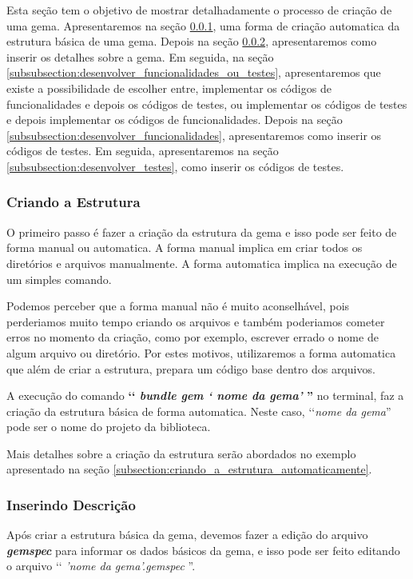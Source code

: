 Esta seção tem o objetivo de mostrar detalhadamente o processo de criação de uma gema.
Apresentaremos na seção \ref{subsubsection:criando_a_estrutura}, uma forma de criação automatica da
estrutura básica de uma gema. Depois na seção \ref{subsubsection:inserindo_descrição},
apresentaremos como inserir os detalhes sobre a gema. Em seguida, na seção
\ref{subsubsection:desenvolver_funcionalidades_ou_testes}, apresentaremos que existe a possibilidade
de escolher entre, implementar os códigos de funcionalidades e depois os códigos de testes, ou
implementar os códigos de testes e depois implementar os códigos de funcionalidades. Depois na seção
\ref{subsubsection:desenvolver_funcionalidades}, apresentaremos como inserir os códigos de testes. Em
seguida, apresentaremos na seção \ref{subsubsection:desenvolver_testes}, como inserir os
códigos de testes.


\subsubsection{Criando a Estrutura}
\label{subsubsection:criando_a_estrutura}


O primeiro passo é fazer a criação da estrutura da gema e isso pode ser feito de forma manual ou automatica.
A forma manual implica em criar todos os diretórios e arquivos manualmente. A forma automatica implica na
execução de um simples comando.

Podemos perceber que a forma manual não é muito aconselhável, pois perderiamos muito tempo criando
os arquivos e também poderiamos cometer erros no momento da criação, como por exemplo, escrever errado
o nome de algum arquivo ou diretório. Por estes motivos, utilizaremos a forma automatica
que além de criar a estrutura, prepara um código base dentro dos arquivos.

A execução do comando \textbf{‘‘ \emph{bundle gem ‘ nome da gema'} ''} no terminal, faz a criação da
estrutura básica de forma automatica. Neste caso, ‘‘\emph{nome da gema}'' pode ser o nome do projeto
da biblioteca.

Mais detalhes sobre a criação da estrutura serão abordados no exemplo apresentado na seção
\ref{subsection:criando_a_estrutura_automaticamente}.


\subsubsection{Inserindo Descrição}
\label{subsubsection:inserindo_descrição}


Após criar a estrutura básica da gema, devemos fazer a edição do arquivo \emph{\textbf{gemspec}}
para informar os dados básicos da gema, e isso pode ser feito editando o arquivo ‘‘ \emph{'nome da gema'.gemspec }''.

